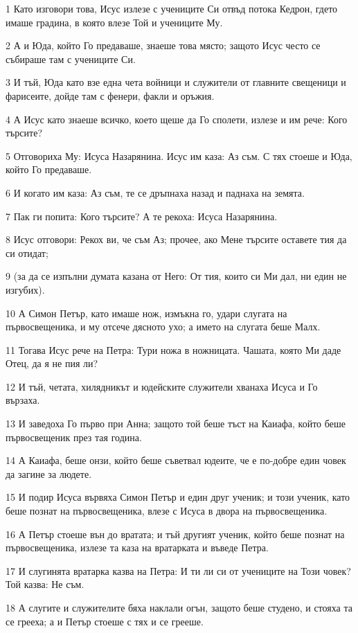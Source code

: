 \par 1 Като изговори това, Исус излезе с учениците Си отвъд потока Кедрон, гдето имаше градина, в която влезе Той и учениците Му.
\par 2 А и Юда, който Го предаваше, знаеше това място; защото Исус често се събираше там с учениците Си.
\par 3 И тъй, Юда като взе една чета войници и служители от главните свещеници и фарисеите, дойде там с фенери, факли и оръжия.
\par 4 А Исус като знаеше всичко, което щеше да Го сполети, излезе и им рече: Кого търсите?
\par 5 Отговориха Му: Исуса Назарянина. Исус им каза: Аз съм. С тях стоеше и Юда, който Го предаваше.
\par 6 И когато им каза: Аз съм, те се дръпнаха назад и паднаха на земята.
\par 7 Пак ги попита: Кого търсите? А те рекоха: Исуса Назарянина.
\par 8 Исус отговори: Рекох ви, че съм Аз; прочее, ако Мене търсите оставете тия да си отидат;
\par 9 (за да се изпълни думата казана от Него: От тия, които си Ми дал, ни един не изгубих).
\par 10 А Симон Петър, като имаше нож, измъкна го, удари слугата на първосвещеника, и му отсече дясното ухо; а името на слугата беше Малх.
\par 11 Тогава Исус рече на Петра: Тури ножа в ножницата. Чашата, която Ми даде Отец, да я не пия ли?
\par 12 И тъй, четата, хилядникът и юдейските служители хванаха Исуса и Го вързаха.
\par 13 И заведоха Го първо при Анна; защото той беше тъст на Каиафа, който беше първосвещеник през тая година.
\par 14 А Каиафа, беше онзи, който беше съветвал юдеите, че е по-добре един човек да загине за людете.
\par 15 И подир Исуса вървяха Симон Петър и един друг ученик; и този ученик, като беше познат на първосвещеника, влезе с Исуса в двора на първосвещеника.
\par 16 А Петър стоеше вън до вратата; и тъй другият ученик, който беше познат на първосвещеника, излезе та каза на вратарката и въведе Петра.
\par 17 И слугинята вратарка казва на Петра: И ти ли си от учениците на Този човек? Той казва: Не съм.
\par 18 А слугите и служителите бяха наклали огън, защото беше студено, и стояха та се грееха; а и Петър стоеше с тях и се грееше.
